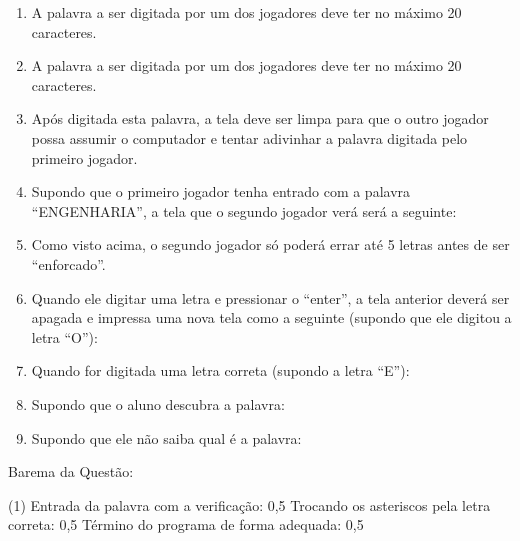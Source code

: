\documentclass[12pt,a4paper]{article}
\begin{document}
\begin{enumerate}[label=\arabic*]
\item A palavra a ser digitada por um dos jogadores deve ter no máximo 20 caracteres.
\item A palavra a ser digitada por um dos jogadores deve ter no máximo 20 caracteres.
\item Após digitada esta palavra, a tela deve ser limpa para que o outro jogador possa assumir o computador e tentar adivinhar a palavra digitada pelo primeiro jogador.
\item Supondo que o primeiro jogador tenha entrado com a palavra “ENGENHARIA”, a tela que o segundo jogador verá será a seguinte:\\
\noindent{}
\item Como visto acima, o segundo jogador só poderá errar até 5 letras antes de ser “enforcado”.
\item Quando ele digitar uma letra e pressionar o “enter”, a tela anterior deverá ser apagada e impressa uma nova tela como a seguinte (supondo que ele digitou a letra “O”):\\
\noindent{}
\item Quando for digitada uma letra correta (supondo a letra “E”):\\
\noindent{}
\item Supondo que o aluno descubra a palavra:\\
\noindent{}
\item Supondo que ele não saiba qual é a palavra:\\
\noindent{}
\end{enumerate}
Barema da Questão:
\begin{tasks}(1)
\task Entrada da palavra com a verificação: 0,5
\task Trocando os asteriscos pela letra correta: 0,5
\task Término do programa de forma adequada: 0,5
\end{tasks}
\end{document}
